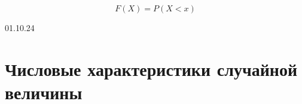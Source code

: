         \begin{sv}
            \begin{equation}
                F(X) = P(X < x)
            \end{equation}
        \end{sv}




    \vspace{2cm}
    \begin{center}\large{01.10.24}\end{center}

    \section{Числовые характеристики случайной величины}
